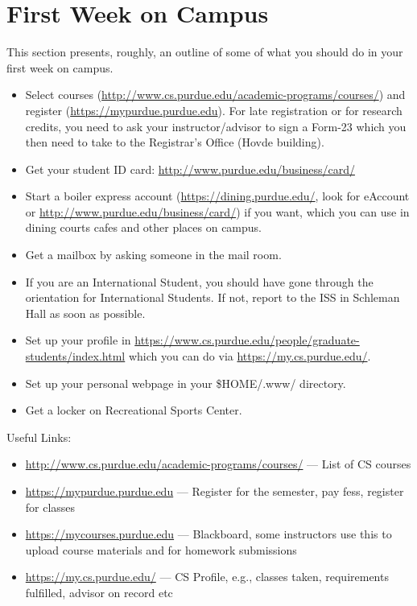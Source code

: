 \section{First Week on Campus}

This section presents, roughly, an outline of some of what you should do in your first week on campus.

\begin{itemize}
	\item Select courses (\url{http://www.cs.purdue.edu/academic-programs/courses/}) and register (\url{https://mypurdue.purdue.edu}). For late registration or for research credits, you need to ask your instructor/advisor to sign a Form-23 which you then need to take to the Registrar's Office (Hovde building).

	\item Get your student ID card: \url{http://www.purdue.edu/business/card/}

	\item Start a boiler express account (\url{https://dining.purdue.edu/}, look for eAccount or \url{http://www.purdue.edu/business/card/}) if you want, which you can use in dining courts cafes and other places on campus.

	\item Get a mailbox by asking someone in the mail room.

	\item If you are an International Student, you should have gone through the orientation for International Students. If not, report to the ISS in Schleman Hall as soon as possible.

	\item Set up your profile in \url{https://www.cs.purdue.edu/people/graduate-students/index.html} which you can do via \url{https://my.cs.purdue.edu/}.

	\item Set up your personal webpage in your \$HOME/.www/ directory.

	\item Get a locker on Recreational Sports Center.

\end{itemize}

Useful Links:
\begin{itemize}
	\item \url{http://www.cs.purdue.edu/academic-programs/courses/} --- List of CS courses

	\item \url{https://mypurdue.purdue.edu} --- Register for the semester, pay fess, register for classes

	\item \url{https://mycourses.purdue.edu} --- Blackboard, some instructors use this to upload course materials and for homework submissions

	\item \url{https://my.cs.purdue.edu/} --- CS Profile, e.g., classes taken, requirements fulfilled, advisor on record etc
\end{itemize}
